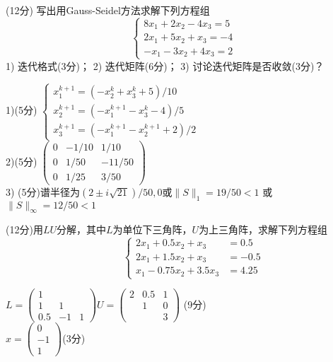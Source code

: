 \documentclass[12pt,letter]{ustcexam}
\begin{document}
\begin{problems}
\newpage
\qu (12分)  写出用Gauss-Seidel方法求解下列方程组
$$\begin {cases} 8x_1+2x_2-4x_3=5\\ 2 x_1+5x_2+ x_3=-4 \\ -x_1-3x_2+4x_3=2
\end{cases}$$
1) 迭代格式(3分)；  2) 迭代矩阵(6分)； 3) 讨论迭代矩阵是否收敛(3分)？
\begin{sol}
1)(5分)
$
\left\{\begin{array}{l}
x_1^{k+1}=(-x_2^k+x_3^k+5)/10 \\
x_2^{k+1}=(-x_1^{k+1}-x_3^k-4)/5 \\
x_3^{k+1}=(-x_1^{k+1}-x_2^{k+1}+2)/2
\end{array}\right.
$ \\
2)(5分)
$
\left(\begin{array}{ccc}
0 & -1/10 & 1/10 \\
0 & 1/50 & -11/50 \\
0 & 1/25 & 3/50
\end{array}\right)
$ \\
3) (5分)谱半径为$(2\pm i\sqrt{21})/50,0$或$\|S\|_1=19/50<1$
   或$\|S\|_{\infty}=12/50<1$
\end{sol}

\newpage
\qu (12分)用$LU$分解，其中$L$为单位下三角阵，$U$为上三角阵，求解下列方程组
\[  \qquad \begin{cases}
2x_1+ 0.5x_2 + x_3&=0.5 \\
2x_1+ 1.5x_2 + x_3&=-0.5\\
x_1-0.75x_2 + 3.5x_3&=4.25
\end{cases}\]
\begin{sol}
$
L=
\left(\begin{array}{ccc}
1 &  &  \\
1 & 1 &  \\
0.5 & -1 & 1
\end{array}\right)
U=
\left(\begin{array}{ccc}
2 & 0.5  & 1 \\
 & 1 & 0  \\
 &  & 3
\end{array}\right)
$
(9分)\\
$
x=
\left(\begin{array}{l}
0 \\
-1 \\
1
\end{array}\right)
$(3分)
\end{sol}


\end{problems}
\end{document}
